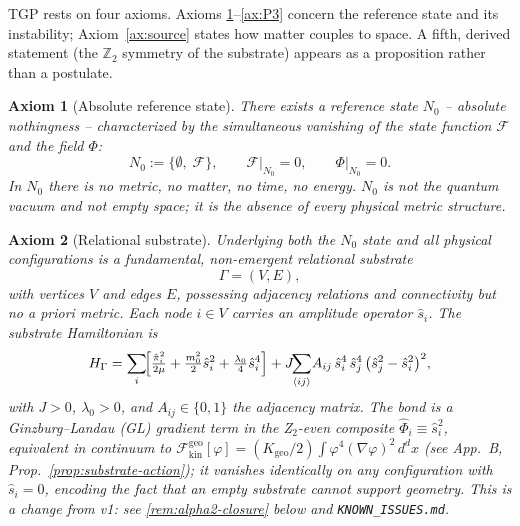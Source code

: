 \documentclass[11pt,a4paper]{article}
\renewcommand{\Phi}{\varPhi}
\newcommand{\Nzero}{N_{0}}
\newcommand{\Ffield}{\mathcal{F}}
\newcommand{\Zp}{\mathbb{Z}_{2}}
\newtheorem{axiom}{Axiom}
\begin{document}
TGP rests on four axioms. Axioms \ref{ax:N0}--\ref{ax:P3} concern the
reference state and its instability; Axiom~\ref{ax:source} states how
matter couples to space. A fifth, derived statement (the $\Zp$ symmetry
of the substrate) appears as a proposition rather than a postulate.

\begin{axiom}[Absolute reference state]\label{ax:N0}
There exists a reference state $\Nzero$ -- \emph{absolute nothingness} --
characterized by the simultaneous vanishing of the state function
$\Ffield$ and the field $\Phi$:
\begin{equation}\label{eq:N0}
  \Nzero := \bigl\{\emptyset,\;\Ffield\bigr\},
  \qquad
  \Ffield\big|_{\Nzero}=0,
  \qquad
  \Phi\big|_{\Nzero}=0.
\end{equation}
In $\Nzero$ there is no metric, no matter, no time, no energy.
$\Nzero$ is \emph{not} the quantum vacuum and \emph{not} empty space;
it is the absence of every physical metric structure.
\end{axiom}

\begin{axiom}[Relational substrate]\label{ax:substrate}
Underlying both the $\Nzero$ state and all physical configurations is a
fundamental, non-emergent relational substrate
\begin{equation}\label{eq:Gamma}
  \Gamma=(V,E),
\end{equation}
with vertices $V$ and edges $E$, possessing adjacency relations and
connectivity but \emph{no a priori metric}. Each node $i\in V$ carries an
amplitude operator $\hat{s}_{i}$. The substrate Hamiltonian is
\begin{equation}\label{eq:H-Gamma}
  H_{\Gamma}=\sum_{i}\!\Bigl[
    \tfrac{\hat{\pi}_{i}^{2}}{2\mu}
    +\tfrac{m_{0}^{2}}{2}\hat{s}_{i}^{2}
    +\tfrac{\lambda_{0}}{4}\hat{s}_{i}^{4}
  \Bigr]
  + J\!\!\sum_{\langle ij\rangle}\! A_{ij}\,
    \hat{s}_{i}^{4}\,\hat{s}_{j}^{4}\,
    \bigl(\hat{s}_{j}^{2}-\hat{s}_{i}^{2}\bigr)^{2},
\end{equation}
with $J>0$, $\lambda_{0}>0$, and $A_{ij}\in\{0,1\}$ the adjacency matrix.
The bond is a Ginzburg--Landau (GL) gradient term in the Z$_{2}$-even
composite $\hat{\Phi}_{i}\equiv\hat{s}_{i}^{2}$, equivalent in continuum
to $\mathcal{F}_{\mathrm{kin}}^{\mathrm{geo}}[\varphi]=
(K_{\mathrm{geo}}/2)\int\varphi^{4}(\nabla\varphi)^{2}\,d^{d}x$ (see
App.~B, Prop.~\ref{prop:substrate-action}); it vanishes identically on
any configuration with $\hat{s}_{i}=0$, encoding the fact that
\emph{an empty substrate cannot support geometry}. This is a change
from v1: see \ref{rem:alpha2-closure} below and
\texttt{KNOWN\_ISSUES.md}.
\end{axiom}
\end{document}
